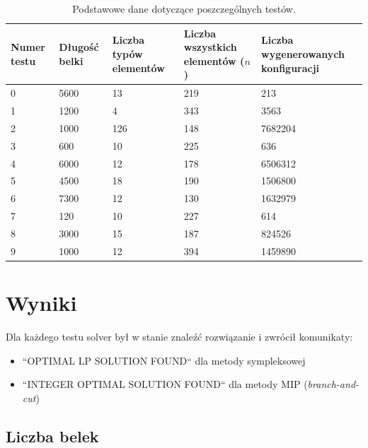 \begin{table}[H] 
	\begin{center}
		\begin{tabular}{|p{3cm}|p{3cm}|p{3cm}|p{3cm}|p{3cm}| } \hline
			Numer testu & Długość belki & Liczba typów elementów & Liczba wszystkich elementów ($n$) & Liczba wygenerowanych konfiguracji\\ 
			\hline
			0 & 5600 & 13 & 219 & 213\\ 
			1 & 1200 & 4 & 343 & 3563\\ 
			2 & 1000 & 126 & 148 & 7682204\\ 
			3 & 600 & 10 & 225 & 636\\ 
			4 & 6000 & 12 & 178 & 6506312\\ 
			5 & 4500 & 18 & 190 & 1506800\\ 
			6 & 7300 & 12 & 130 & 1632979\\ 
			7 & 120 & 10 & 227 & 614\\ 
			8 & 3000 & 15 & 187 & 824526\\ 
			9 & 1000 & 12 & 394 & 1459890\\ 
			
			\hline
		\end{tabular}
		\caption{Podstawowe dane dotyczące poszczególnych testów.}
	\end{center}
\end{table}


\section{Wyniki}

Dla każdego testu solver był w stanie znaleźć rozwiązanie i zwrócił komunikaty:
\begin{itemize}
	\item ``OPTIMAL LP SOLUTION FOUND`` dla metody sympleksowej
	\item ``INTEGER OPTIMAL SOLUTION FOUND`` dla metody MIP (\textit{branch-and-cut})
\end{itemize}

\subsection{Liczba belek}


